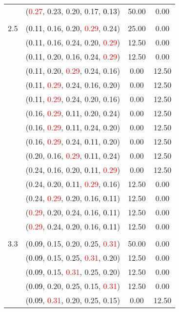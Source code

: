 \documentclass[10pt,a4paper]{report}
\begin{document}
\begin{center}
\begin{longtable}{clcc}
			&(\textcolor{red}{0.27}, 0.23, 0.20, 0.17, \textcolor{black}{0.13})&50.00&0.00\\
		&&&\\
		2.5			&(\textcolor{black}{0.11}, 0.16, 0.20, \textcolor{red}{0.29}, 0.24)&25.00&0.00\\
			&(\textcolor{black}{0.11}, 0.16, 0.24, 0.20, \textcolor{red}{0.29})&12.50&0.00\\
			&(\textcolor{black}{0.11}, 0.20, 0.16, 0.24, \textcolor{red}{0.29})&12.50&0.00\\
			&(\textcolor{black}{0.11}, 0.20, \textcolor{red}{0.29}, 0.24, 0.16)&0.00&12.50\\
			&(\textcolor{black}{0.11}, \textcolor{red}{0.29}, 0.24, 0.16, 0.20)&0.00&12.50\\
			&(\textcolor{black}{0.11}, \textcolor{red}{0.29}, 0.24, 0.20, 0.16)&0.00&12.50\\
			&(0.16, \textcolor{red}{0.29}, \textcolor{black}{0.11}, 0.20, 0.24)&0.00&12.50\\
			&(0.16, \textcolor{red}{0.29}, \textcolor{black}{0.11}, 0.24, 0.20)&0.00&12.50\\
			&(0.16, \textcolor{red}{0.29}, 0.24, \textcolor{black}{0.11}, 0.20)&0.00&12.50\\
			&(0.20, 0.16, \textcolor{red}{0.29}, \textcolor{black}{0.11}, 0.24)&0.00&12.50\\
			&(0.24, 0.16, 0.20, \textcolor{black}{0.11}, \textcolor{red}{0.29})&0.00&12.50\\
			&(0.24, 0.20, \textcolor{black}{0.11}, \textcolor{red}{0.29}, 0.16)&12.50&0.00\\
			&(0.24, \textcolor{red}{0.29}, 0.20, 0.16, \textcolor{black}{0.11})&12.50&0.00\\
			&(\textcolor{red}{0.29}, 0.20, 0.24, 0.16, \textcolor{black}{0.11})&12.50&0.00\\
			&(\textcolor{red}{0.29}, 0.24, 0.20, 0.16, \textcolor{black}{0.11})&12.50&0.00\\
		&&&\\
		3.3			&(\textcolor{black}{0.09}, 0.15, 0.20, 0.25, \textcolor{red}{0.31})&50.00&0.00\\
			&(\textcolor{black}{0.09}, 0.15, 0.25, \textcolor{red}{0.31}, 0.20)&12.50&0.00\\
			&(\textcolor{black}{0.09}, 0.15, \textcolor{red}{0.31}, 0.25, 0.20)&12.50&0.00\\
			&(\textcolor{black}{0.09}, 0.20, 0.25, 0.15, \textcolor{red}{0.31})&12.50&0.00\\
			&(\textcolor{black}{0.09}, \textcolor{red}{0.31}, 0.20, 0.25, 0.15)&0.00&12.50\\

\end{longtable}
\end{center}
\end{document}
